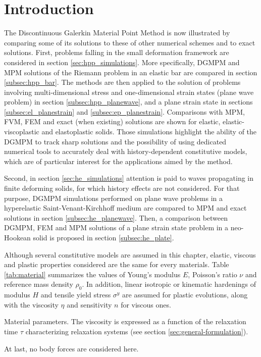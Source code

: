 \section*{Introduction}
The Discontinuous Galerkin Material Point Method is now illustrated by comparing some of its solutions to these of other numerical schemes and to exact solutions.
First, problems falling in the small deformation framework are considered in section \ref{sec:hpp_simulations}. More specifically, DGMPM and MPM solutions of the Riemann problem in an elastic bar are compared in section \ref{subsec:hpp_bar}. The methods are then applied to the solution of problems involving multi-dimensional stress and one-dimensional strain states (plane wave problem) in section \ref{subsec:hpp_planewave}, and a plane strain state in sections \ref{subsec:el_planestrain} and \ref{subsec:ep_planestrain}. Comparisons with MPM, FVM, FEM and exact (when existing) solutions are shown for elastic, elastic-viscoplastic and elastoplastic solids.
Those simulations highlight the ability of the DGMPM to track sharp solutions and the possibility of using dedicated numerical tools to accurately deal with history-dependent constitutive models, which are of particular interest for the applications aimed by the method. 

Second, in section \ref{sec:he_simulations} attention is paid to waves propagating in finite deforming solids, for which history effects are not considered.
For that purpose, DGMPM simulations performed on plane wave problems in a hyperelastic Saint-Venant-Kirchhoff medium are compared to MPM and exact solutions in section \ref{subsec:he_planewave}. Then, a comparison between DGMPM, FEM and MPM solutions of a plane strain state problem in a neo-Hookean solid is proposed in section \ref{subsec:he_plate}.

Although several constitutive models are assumed in this chapter, elastic, viscous and plastic properties considered are the same for every materials. Table \ref{tab:material} summarizes the values of Young's modulus $E$, Poisson's ratio $\nu$ and reference mass density $\rho_0$.
In addition, linear isotropic or kinematic hardenings of modulus $H$ and tensile yield stress $\sigma^y$ are assumed for plastic evolutions, along with the viscosity $\eta$ and sensitivity $n$ for viscous ones.
\begin{table}[h!]
  \centering
  
  \caption{Material parameters. The viscosity is expressed as a function of the relaxation time $\tau$ characterizing relaxation systems (see section \ref{sec:general-formulation}).}
  \label{tab:material}
\end{table}
At last, no body forces are considered here.
